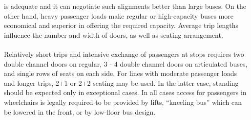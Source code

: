 is adequate and it can negotiate such alignments better than large buses. On the other hand, heavy passenger loads make regular or high-capacity buses more economical and superior in offering the required capacity. Average trip lengths influence the number and width of doors, as well as seating arrangement.\\\\
Relatively short trips and intensive exchange of passengers at stops requires two double channel doors on regular, 3 - 4 double channel doors on articulated buses, and single rows
of seats on each side. For lines with moderate passenger loads and longer trips, 2+1 or 2+2 seating may be used. In the latter case, standing should be expected only in exceptional cases. In all cases access for passengers in wheelchairs is legally required to be provided by lifts, “kneeling bus” which can be lowered in the front, or by low-floor bus design.\\\\
